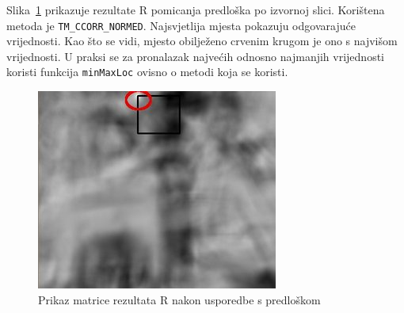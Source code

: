 Slika~\ref{fig:tm3.jpg} prikazuje rezultate R pomicanja predloška po
izvornoj slici. Korištena metoda je \texttt{TM\_CCORR\_NORMED}.
Najsvjetlija mjesta pokazuju odgovarajuće vrijednosti. Kao što se vidi,
mjesto obilježeno crvenim krugom je ono s najvišom vrijednosti. U praksi
se za pronalazak najvećih odnosno najmanjih vrijednosti koristi funkcija
\texttt{minMaxLoc} ovisno o metodi koja se koristi.


\begin{figure}[h]
\centering
\includegraphics[scale=0.8]{figures/tm3.jpg}
\caption{Prikaz matrice rezultata R nakon usporedbe s predloškom}
\label{fig:tm3.jpg}
\end{figure}

